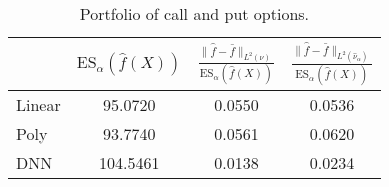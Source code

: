 \begin{table}[ht]
\centering
\begin{tabular}{lccc}
\toprule
 & $\mathrm{ES}_{\alpha}(\hat{f}(X))$ & $\frac{\|\hat f - \bar f\|_{L^2(\nu)}}{\mathrm{ES}_{\alpha}(\hat{f}(X))}$ & $\frac{\|\hat f - \bar f\|_{L^2(\hat \nu_\alpha)}}{\mathrm{ES}_{\alpha}(\hat{f}(X))}$ \\
\midrule
Linear & 95.0720 & 0.0550 & 0.0536 \\
Poly & 93.7740 & 0.0561 & 0.0620 \\
DNN & 104.5461 & 0.0138 & 0.0234 \\
\bottomrule
\end{tabular}
\caption{Portfolio of call and put options.}
\end{table}

